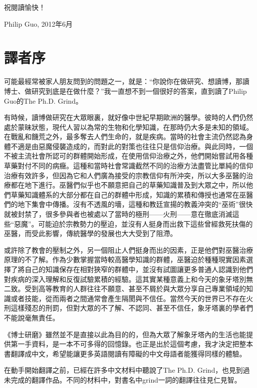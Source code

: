 \documentclass[12pt,UTF8,nofonts]{book}
\newcommand{\bookname}{博士研磨}
\begin{document}
祝閱讀愉快！

\begin{flushright}
Philip Guo, 2012年6月
\end{flushright}

\chapter*{譯者序}
\markboth{}{}


可能最經常被家人朋友問到的問題之一，就是：“你說你在做研究、想讀博，那讀博士、做研究到底是在做什麼？”我一直想不到一個很好的答案，直到讀了Philip Guo的The Ph.D. Grind。

有時候，讀博做研究在大眾眼裏，就好像中世紀早期歐洲的醫學。彼時的人們仍然處於蒙昧狀態，現代人習以為常的生物和化學知識，在那時仍大多是未知的領域。在戰亂和饑荒之外，最多奪去人們生命的，就是疾病。當時的社會主流仍然認為身體不適是由惡魔侵襲造成的，而對此的對策也往往只是信仰治療。與此同時，一個不被主流社會所認可的群體開始形成，在使用信仰治療之外，他們開始嘗試用各種草藥對付不同的病癥。這種和當時社會常識截然不同的治療方法盡管比單純的信仰治療有效許多，但因為它和人們廣為接受的宗教信仰有所沖突，所以大多巫醫的治療都在地下進行。巫醫們似乎也不願意把自己的草藥知識普及到大眾之中，所以他們草藥知識體系的大部分都在自己的群體中形成，知識的累積和傳授也通常在巫醫們的地下集會中傳播。沒有不透風的墻，這種和教廷宣揚的教義沖突的“巫術”很快就被封禁了，很多參與者也被處以了當時的極刑——火刑——意在徹底消滅這些“惡魔”。可能迫於宗教勢力的壓迫，並沒有人挺身而出救下這些曾經救死扶傷的巫醫，而受此影響，傳統醫學的發展也大大受到了阻滯。

或許除了教會的壓制之外，另一個阻止人們挺身而出的因素，正是他們對巫醫治療原理的不了解。作為少數掌握當時較高醫學知識的群體，巫醫迫於種種現實因素選擇了將自己的知識保存在相對狹窄的群體中，並沒有試圖讓更多普通人認識到他們對疾病的深入理解和反復試驗累積的經驗。這其實某種意義上和今天的象牙塔別無二致。受到高等教育的人群往往不願意、甚至不屑於與大眾分享自己專業領域的知識或者技能，從而兩者之間通常會產生隔閡與不信任。當然今天的世界已不存在火刑這樣殘忍的刑罰，但對大眾的不了解、不認同、甚至不信任，象牙塔裏的學者們不能說毫無責任。

《\bookname》雖然並不是直接以此為目的的，但為大眾了解象牙塔內的生活也能提供第一手資料，是一本不可多得的回憶錄。也正是出於這個考慮，我才決定把整本書翻譯成中文，希望能讓更多英語閱讀有障礙的中文母語者能獲得同樣的體驗。


在動手開始翻譯之前，已經在許多中文材料中聽說了The Ph.D. Grind，也見到過未完成的翻譯作品。不同的材料中，對書名中grind一詞的翻譯往往見仁見智。
\end{document}
